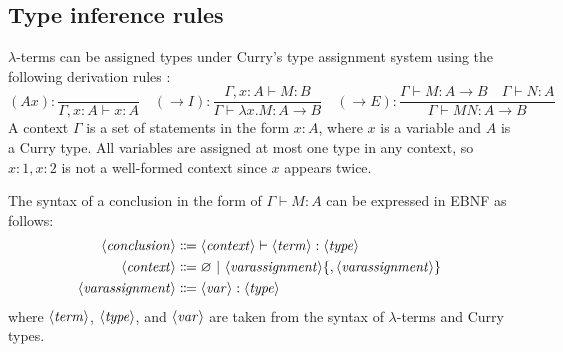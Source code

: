 \subsection{Type inference rules}
$\lambda$-terms can be assigned types under Curry's type assignment system using the following derivation rules \cite{van-bakel:2022} :
\[
    (Ax): \frac{}{\Gamma, x:A \vdash x:A} \quad (\rightarrow I): \frac{\Gamma, x:A \vdash M:B}{\Gamma \vdash \lambda x. M: A \rightarrow B} \quad (\rightarrow E): \frac{\Gamma \vdash M: A \rightarrow B \quad \Gamma \vdash N: A}{\Gamma \vdash MN: A \rightarrow B}
\]
A context $\Gamma$ is a set of statements in the form $x:A$, where $x$ is a variable and $A$ is a Curry type. All variables are assigned at most one type in any context, so $x:1, x:2$ is not a well-formed context since $x$ appears twice.

The syntax of a conclusion in the form of $\Gamma \vdash M: A$ can be expressed in EBNF as follows:
\begin{align*}
    \langle\mathit{conclusion}\rangle &\Coloneqq \langle\mathit{context}\rangle \vdash \langle\mathit{term}\rangle : \langle\mathit{type}\rangle \\
    \langle\mathit{context}\rangle &\Coloneqq \varnothing \ |\  \langle\mathit{varassignment}\rangle \{, \langle\mathit{varassignment}\rangle \} \\
    \langle\mathit{varassignment}\rangle &\Coloneqq \langle\mathit{var}\rangle : \langle\mathit{type}\rangle
\end{align*}
where $\langle\mathit{term}\rangle$, $\langle\mathit{type}\rangle$, and $\langle\mathit{var}\rangle$ are taken from the syntax of $\lambda$-terms and Curry types.